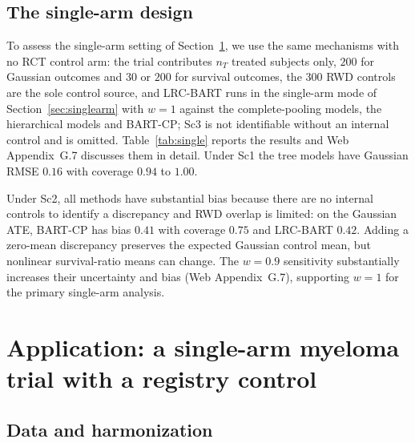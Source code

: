 

\subsection{The single-arm design}
\label{sec:sim_single}

To assess the single-arm setting of Section~\ref{sec:application}, we use the same mechanisms with no RCT control arm: the trial contributes $n_T$ treated subjects only, $200$ for Gaussian outcomes and $30$ or $200$ for survival outcomes, the $300$ RWD controls are the sole control source, and LRC-BART runs in the single-arm mode of Section~\ref{sec:singlearm} with $w=1$ against the complete-pooling models, the hierarchical models and BART-CP; Sc3 is not identifiable without an internal control and is omitted. Table~\ref{tab:single} reports the results and Web Appendix~G.7 discusses them in detail. Under Sc1 the tree models have Gaussian RMSE $0.16$ with coverage $0.94$ to $1.00$.

Under Sc2, all methods have substantial bias because there are no internal controls to identify a discrepancy and RWD overlap is limited: on the Gaussian ATE, BART-CP has bias $0.41$ with coverage $0.75$ and LRC-BART $0.42$. Adding a zero-mean discrepancy preserves the expected Gaussian control mean, but nonlinear survival-ratio means can change. The $w=0.9$ sensitivity substantially increases their uncertainty and bias (Web Appendix~G.7), supporting $w=1$ for the primary single-arm analysis.



\section{Application: a single-arm myeloma trial with a registry control}
\label{sec:application}

\subsection{Data and harmonization}
\label{sec:app_data}

